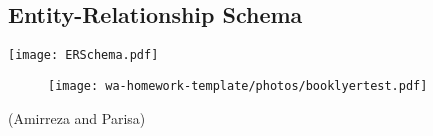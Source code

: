 \subsection{Entity-Relationship Schema}

\texttt{[image: ERSchema.pdf]}
\begin{figure}[!h]
\centering
    \texttt{[image: wa-homework-template/photos/booklyertest.pdf]}
    \label{fig:erd}
\end{figure}


(Amirreza and Parisa)
